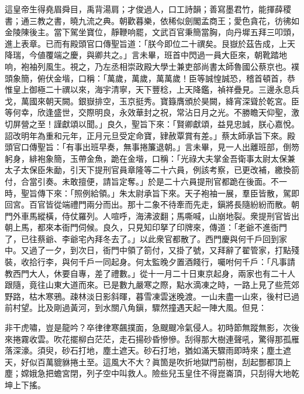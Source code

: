 這皇帝生得堯眉舜目，禹背湯肩；才俊過人，口工詩韻；善寫墨君竹，能揮薛稷書；通三教之書，曉九流之典。朝歡暮樂，依稀似劍閣孟商王；愛色貪花，彷彿如金陵陳後主。{}當下駕坐寶位，靜鞭响罷，文武百官秉簡當胸，向丹墀五拜三叩頭，進上表章。已而有殿頭官口傳聖旨道：「朕今即位二十禩矣。艮嶽於茲告成，上天降瑞，今値覆端之慶，與卿共之。」言未畢，班首中閃過一員大臣來，朝靴踏地响，袍袖列風生。視之，乃左丞相崇政殿大學士兼吏部尚書太師魯國公蔡京也。襆頭象簡，俯伏金堦，口稱：「萬歲，萬歲，萬萬歲！臣等誠惶誠恐，稽首頓首，恭惟皇上御極二十禩以來，海宇清寧，天下豐稔，上天降鑑，禎祥疊見。三邊永息兵戈，萬國來朝天闕。銀嶽排空，玉京挺秀。寶籙膺頒於昊闕，絳宵深聳於乾宮。{}臣等何幸，欣逢盛世，交際明良，永效華封之祝，常沾日月之光。不勝瞻天仰聖，激切屏營之至！謹獻頌以聞。」{}良久，聖旨下來：「賢卿獻頌，益見忠誠，朕心嘉悅。詔改明年為重和元年，正月元旦受定命寶，肄赦覃賞有差。」蔡太師承旨下來。殿頭官口傳聖旨：「有事出班早奏，無事捲簾退朝。」言未畢，見一人出離班部，倒笏躬身，緋袍象簡，玉帶金魚，跪在金堦，口稱：「光祿大夫掌金吾衛事太尉太保兼太子太保臣朱勔，引天下提刑官員章隆等二十六員，例該考察，已更改補，繳換箚付，合當引奏。未敢擅便，請旨定奪。」於是二十六員提刑官都跪在後面。不一時，聖旨傳下來：「照例給領。」朱太尉承旨下來。天子袍袖一展，羣臣皆散，駕即回宮。百官皆從端禮門兩分而出。那十二象不待牽而先走，鎭將長隨紛紛而散。朝門外車馬縱橫，侍仗羅列。人喧呼，海沸波翻；馬嘶喊，山崩地裂。衆提刑官皆出朝上馬，都來本衙門伺候。良久，只見知印拏了印牌來，傳道：「老爺不進衙門了，已往蔡爺、李爺宅內拜冬去了。」以此衆官都散了。西門慶與何千戶回到家中。又過了一夕，到次日，衙門中領了箚付，又掛了號，又拜辭了翟管家，打點殘裝，收拾行李，與何千戶一同起身。何太監晚夕置酒餞行，囑咐何千戶：「凡事請教西門大人，休要自專，差了禮數。」從十一月二十日東京起身，兩家也有二十人跟隨，竟往山東大道而來。已是數九嚴寒之際，點水滴凍之時，一路上見了些荒郊野路，枯木寒鴉。疎林淡日影斜暉，暮雪凍雲迷晚渡。一山未盡一山來，後村已過前村望。比及剛過黃河，到水關八角鎭，驟然撞遇天起一陣大風。{}但見：

\begin{myquote}
非干虎嘯，豈是龍吟？卒律律寒飆撲面，急颼颼冷氣侵人。初時節無蹤無影，次後來捲霧收雲。吹花擺柳白茫茫，走石揚砂昏慘慘。刮得那大樹連聲吼，驚得那孤雁落深濠。須臾，砂石打地，塵土遮天。砂石打地，猶如滿天驟雨即時來；塵土遮天，好似百萬貔貅捲土至。這風大不大？眞箇是吹折地獄門前樹，刮起酆都頂上塵；嫦娥急把蟾宮閉，列子空中叫救人。險些兒玉皇住不得崑崙頂，只刮得大地乾坤上下搖。
\end{myquote}

